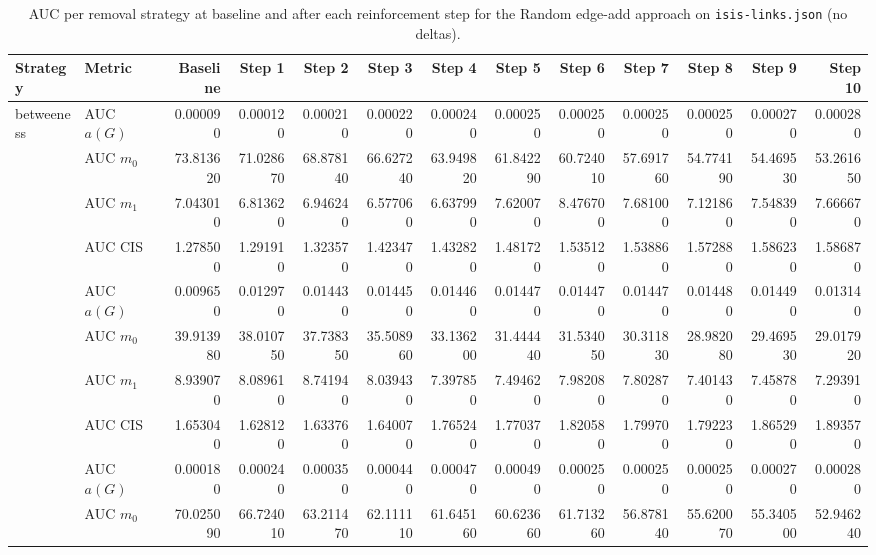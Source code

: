 \begin{table}[htbp]
  \centering
  \caption{AUC per removal strategy at baseline and after each reinforcement step for the Random edge-add approach on \texttt{isis-links.json} (no deltas).}
  \label{tab:isis-links-random_add-auc}
\setlength{\tabcolsep}{2.5pt}
  \begin{tabular}{llrrrrrrrrrrr}
    \toprule
    \textbf{Strategy} & \textbf{Metric} & \textbf{Baseline} & \textbf{Step 1} & \textbf{Step 2} & \textbf{Step 3} & \textbf{Step 4} & \textbf{Step 5} & \textbf{Step 6} & \textbf{Step 7} & \textbf{Step 8} & \textbf{Step 9} & \textbf{Step 10} \\
    \midrule
    \multirow{4}{*}{betweeness} & AUC $a(G)$ & 0.000090 & 0.000120 & 0.000210 & 0.000220 & 0.000240 & 0.000250 & 0.000250 & 0.000250 & 0.000250 & 0.000270 & 0.000280 \\
    & AUC $m_0$ & 73.813620 & 71.028670 & 68.878140 & 66.627240 & 63.949820 & 61.842290 & 60.724010 & 57.691760 & 54.774190 & 54.469530 & 53.261650 \\
    & AUC $m_1$ & 7.043010 & 6.813620 & 6.946240 & 6.577060 & 6.637990 & 7.620070 & 8.476700 & 7.681000 & 7.121860 & 7.548390 & 7.666670 \\
    & AUC CIS & 1.278500 & 1.291910 & 1.323570 & 1.423470 & 1.432820 & 1.481720 & 1.535120 & 1.538860 & 1.572880 & 1.586230 & 1.586870 \\
    \addlinespace
    \multirow{4}{*}{closeness} & AUC $a(G)$ & 0.009650 & 0.012970 & 0.014430 & 0.014450 & 0.014460 & 0.014470 & 0.014470 & 0.014470 & 0.014480 & 0.014490 & 0.013140 \\
    & AUC $m_0$ & 39.913980 & 38.010750 & 37.738350 & 35.508960 & 33.136200 & 31.444440 & 31.534050 & 30.311830 & 28.982080 & 29.469530 & 29.017920 \\
    & AUC $m_1$ & 8.939070 & 8.089610 & 8.741940 & 8.039430 & 7.397850 & 7.494620 & 7.982080 & 7.802870 & 7.401430 & 7.458780 & 7.293910 \\
    & AUC CIS & 1.653040 & 1.628120 & 1.633760 & 1.640070 & 1.765240 & 1.770370 & 1.820580 & 1.799700 & 1.792230 & 1.865290 & 1.893570 \\
    \addlinespace
    \multirow{4}{*}{core influence} & AUC $a(G)$ & 0.000180 & 0.000240 & 0.000350 & 0.000440 & 0.000470 & 0.000490 & 0.000250 & 0.000250 & 0.000250 & 0.000270 & 0.000280 \\
    & AUC $m_0$ & 70.025090 & 66.724010 & 63.211470 & 62.111110 & 61.645160 & 60.623660 & 61.713260 & 56.878140 & 55.620070 & 55.340500 & 52.946240 \\

\end{tabular}
\end{table}
